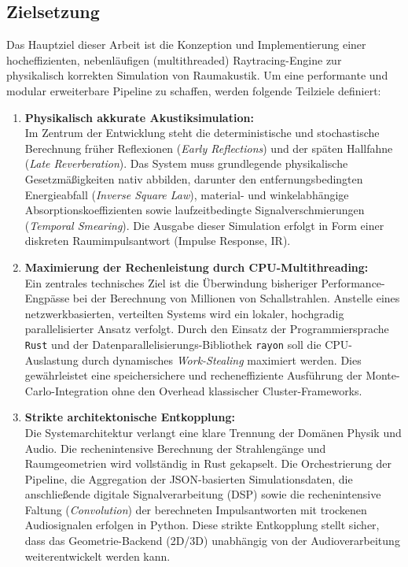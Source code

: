 \documentclass{article}
\begin{document}
    \subsection{Zielsetzung}
    \label{subsec:zielsetzung}

    Das Hauptziel dieser Arbeit ist die Konzeption und Implementierung einer hocheffizienten, nebenläufigen (multithreaded) Raytracing-Engine zur physikalisch korrekten Simulation von Raumakustik.
    Um eine performante und modular erweiterbare Pipeline zu schaffen, werden folgende Teilziele definiert:

    \begin{enumerate}
        \item \textbf{Physikalisch akkurate Akustiksimulation:}\\
        Im Zentrum der Entwicklung steht die deterministische und stochastische Berechnung früher Reflexionen (\textit{Early Reflections}) und der späten Hallfahne (\textit{Late Reverberation}).
        Das System muss grundlegende physikalische Gesetzmäßigkeiten nativ abbilden, darunter den entfernungsbedingten Energieabfall (\textit{Inverse Square Law}),
        material- und winkelabhängige Absorptionskoeffizienten sowie laufzeitbedingte Signalverschmierungen (\textit{Temporal Smearing}).
        Die Ausgabe dieser Simulation erfolgt in Form einer diskreten Raumimpulsantwort (Impulse Response, IR).

        \item \textbf{Maximierung der Rechenleistung durch CPU-Multithreading:}\\
        Ein zentrales technisches Ziel ist die Überwindung bisheriger Performance-Engpässe bei der Berechnung von Millionen von Schallstrahlen.
        Anstelle eines netzwerkbasierten, verteilten Systems wird ein lokaler, hochgradig parallelisierter Ansatz verfolgt.
        Durch den Einsatz der Programmiersprache \texttt{Rust} und der Datenparallelisierungs-Bibliothek \texttt{rayon} soll die CPU-Auslastung durch dynamisches \textit{Work-Stealing} maximiert werden.
        Dies gewährleistet eine speichersichere und recheneffiziente Ausführung der Monte-Carlo-Integration ohne den Overhead klassischer Cluster-Frameworks.

        \item \textbf{Strikte architektonische Entkopplung:}\\
        Die Systemarchitektur verlangt eine klare Trennung der Domänen Physik und Audio.
        Die rechenintensive Berechnung der Strahlengänge und Raumgeometrien wird vollständig in Rust gekapselt.
        Die Orchestrierung der Pipeline, die Aggregation der JSON-basierten Simulationsdaten, die anschließende digitale Signalverarbeitung (DSP) sowie die rechenintensive Faltung
        (\textit{Convolution}) der berechneten Impulsantworten mit trockenen Audiosignalen erfolgen in Python.
        Diese strikte Entkopplung stellt sicher, dass das Geometrie-Backend (2D/3D) unabhängig von der Audioverarbeitung weiterentwickelt werden kann.
    \end{enumerate}
\end{document}
